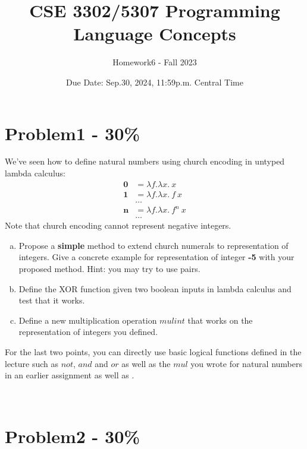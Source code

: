 \documentclass{article}
\begin{document}
\title{CSE 3302/5307 Programming Language Concepts}
\author{Homework6 - Fall 2023}
\date{Due Date: Sep.30, 2024, 11:59p.m. Central Time}
\maketitle
\thispagestyle{fancy}


\section*{Problem1 - 30\%}

	We've seen how to define natural numbers using church encoding in untyped lambda calculus:
	\begin{align*}
		\mathbf{0} &= \lambda f.\lambda x.\ x \\
		\mathbf{1} &= \lambda f.\lambda x.\ f\ x \\
		&\dots \\
		\mathbf{n} &= \lambda f.\lambda x.\ f^n\ x \\
		&\dots
	\end{align*}
	Note that church encoding cannot represent negative integers.
	\begin{enumerate}[(a)]
	\item Propose a \textbf{simple} method to extend church numerals to representation of integers. Give a concrete example for representation of integer \textbf{-5} with your proposed method. Hint: you may try to use pairs.
	
	\item Define the XOR function given two boolean inputs in lambda calculus and test that it works. 

 \item Define a new multiplication operation $mulint$ that works on the representation of integers you defined.
\end{enumerate}

 \noindent For the last two points, you can directly use basic logical functions defined in the lecture such as $not$, $and$ and $or$ as well as the $mul$ you wrote for natural numbers in an earlier assignment as well as .


\newpage 
\ %
\newpage 


\section*{Problem2 - 30\%}
\end{document}
